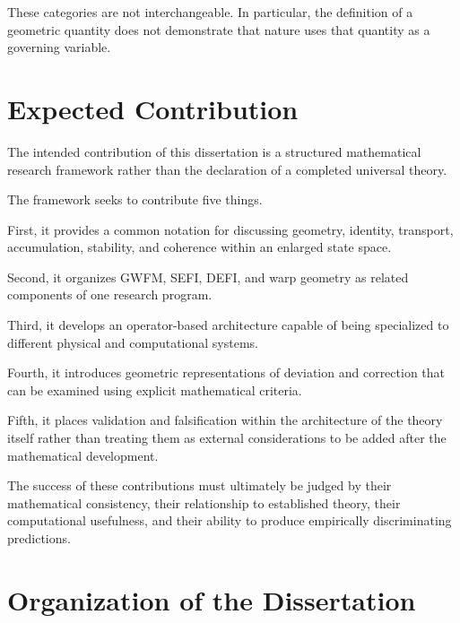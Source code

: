 \documentclass[12pt,oneside]{book}
\begin{document}
These categories are not interchangeable. In particular, the
definition of a geometric quantity does not demonstrate that
nature uses that quantity as a governing variable.


\section{Expected Contribution}
\label{sec:expected-contribution}

The intended contribution of this dissertation is a structured
mathematical research framework rather than the declaration of
a completed universal theory.

The framework seeks to contribute five things.

First, it provides a common notation for discussing geometry,
identity, transport, accumulation, stability, and coherence
within an enlarged state space.

Second, it organizes GWFM, SEFI, DEFI, and warp geometry as
related components of one research program.

Third, it develops an operator-based architecture capable of
being specialized to different physical and computational
systems.

Fourth, it introduces geometric representations of deviation
and correction that can be examined using explicit mathematical
criteria.

Fifth, it places validation and falsification within the
architecture of the theory itself rather than treating them as
external considerations to be added after the mathematical
development.

The success of these contributions must ultimately be judged by
their mathematical consistency, their relationship to
established theory, their computational usefulness, and their
ability to produce empirically discriminating predictions.


\section{Organization of the Dissertation}
\label{sec:dissertation-roadmap}
\end{document}
